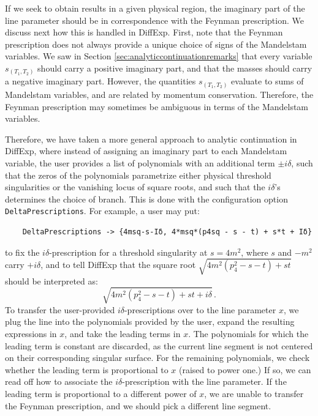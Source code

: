 \documentclass{article}
\begin{document}
If we seek to obtain results in a given physical region, the imaginary part of the line parameter should be in correspondence with the Feynman prescription. We discuss next how this is handled in DiffExp. First, note that the Feynman prescription does not always provide a unique choice of signs of the Mandelstam variables. We saw in Section \ref{sec:analyticcontinuationremarks} that every variable $s_{(T_1,T_2)}$ should carry a positive imaginary part, and that the masses should carry a negative imaginary part. However, the quantities $s_{(T_1,T_2)}$ evaluate to sums of Mandelstam variables, and are related by momentum conservation. Therefore, the Feynman prescription may sometimes be ambiguous in terms of the Mandelstam variables.

Therefore, we have taken a more general approach to analytic continuation in DiffExp, where instead of assigning an imaginary part to each Mandelstam variable, the user provides a list of polynomials with an additional term $\pm i\delta$, such that the zeros of the polynomials parametrize either physical threshold singularities or the vanishing locus of square roots, and such that the $i\delta$'s determines the choice of branch. This is done with the configuration option \texttt{DeltaPrescriptions}. For example, a user may put:
\begin{verbatim}
    DeltaPrescriptions -> {4msq-s-Iδ, 4*msq*(p4sq - s - t) + s*t + Iδ}
\end{verbatim}
to fix the $i\delta$-prescription for a threshold singularity at $s=4m^2$, where $s$ and $-m^2$ carry $+i\delta$, and to tell DiffExp that the square root $\sqrt{4 m^{2}\left(p_{4}^{2}-s-t\right)+s t}$ should be interpreted as:
\begin{equation}
    \sqrt{4 m^{2}\left(p_{4}^{2}-s-t\right)+s t+i\delta}\,.
\end{equation}
To transfer the user-provided $i\delta$-prescriptions over to the line parameter $x$, we plug the line into the polynomials provided by the user, expand the resulting expressions in $x$, and take the leading terms in $x$. The polynomials for which the leading term is constant are discarded, as the current line segment is not centered on their corresponding singular surface. For the remaining polynomials, we check whether the leading term is proportional to $x$ (raised to power one.) If so, we can read off how to associate the $i\delta$-prescription with the line parameter. If the leading term is proportional to a different power of $x$, we are unable to transfer the Feynman prescription, and we should pick a different line segment.
\end{document}
